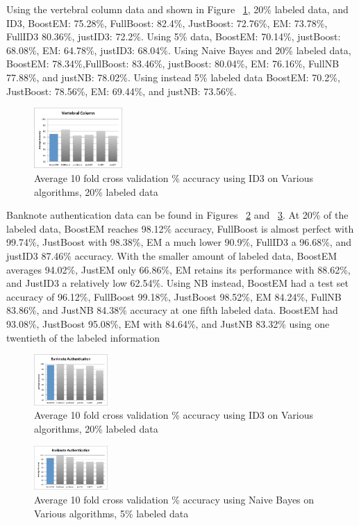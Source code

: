 \documentclass{sig-alternate}
\begin{document}
Using the vertebral column data and shown in Figure ~\ref{vertAcc}, 20\% labeled data, and ID3, BoostEM: 75.28\%, FullBoost: 82.4\%, JustBoost: 72.76\%, EM: 73.78\%, FullID3 80.36\%, justID3: 72.2\%.  Using 5\% data, BoostEM: 70.14\%, justBoost: 68.08\%, EM: 64.78\%, justID3: 68.04\%. 
Using Naive Bayes and 20\% labeled data, BoostEM: 78.34\%,FullBoost: 83.46\%, justBoost: 80.04\%, EM: 76.16\%, FullNB 77.88\%, and justNB: 78.02\%. Using instead 5\% labeled data BoostEM: 70.2\%, JustBoost: 78.56\%, EM: 69.44\%, and justNB: 73.56\%.

\begin{figure}
\centering
\includegraphics[width=0.3\textwidth]{figures/vertAcc.pdf}
\caption{Average 10 fold cross validation \% accuracy using ID3 on Various algorithms, 20\% labeled data}
\label{vertAcc}
\end{figure}

Banknote authentication data can be found in Figures ~\ref{bankAcc} and ~\ref{bankAcc5}. At 20\% of the labeled data, BoostEM reaches 98.12\% accuracy, FullBoost is almost perfect with 99.74\%, JustBoost with 98.38\%, EM a much lower 90.9\%, FullID3 a 96.68\%, and justID3 87.46\% accuracy.  With the smaller amount of labeled data, BoostEM averages 94.02\%, JustEM only 66.86\%, EM retains its performance with 88.62\%, and JustID3 a relatively low 62.54\%.
Using NB instead, BoostEM had a test set accuracy of 96.12\%, FullBoost 99.18\%, JustBoost 98.52\%, EM 84.24\%, FullNB 83.86\%, and JustNB 84.38\% accuracy at one fifth labeled data. BoostEM had 93.08\%, JustBoost 95.08\%, EM with 84.64\%, and JustNB 83.32\% using one twentieth of the labeled information
\begin{figure}[ht!]
\centering
\includegraphics[width=0.25\textwidth]{figures/bankAcc.pdf}
\caption{Average 10 fold cross validation \% accuracy using ID3 on Various algorithms, 20\% labeled data}
\label{bankAcc}
\end{figure}
\begin{figure}
\centering
\includegraphics[width=0.25\textwidth]{figures/bankAcc5.pdf}
\caption{Average 10 fold cross validation \% accuracy using Naive Bayes on Various algorithms, 5\% labeled data}
\label{bankAcc5}
\end{figure}
\end{document}
